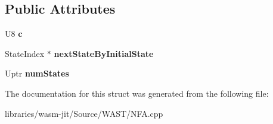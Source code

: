 \subsection*{Public Attributes}
\begin{DoxyCompactItemize}
\item 
\mbox{\label{struct_n_f_a_1_1_state_transitions_by_char_a6d6a713162e6bf59ac1b0cb22acb481a}} 
U8 {\bfseries c}
\item 
\mbox{\label{struct_n_f_a_1_1_state_transitions_by_char_a2ddc6fa25470d3c4f0c8d39a626cddec}} 
State\+Index $\ast$ {\bfseries next\+State\+By\+Initial\+State}
\item 
\mbox{\label{struct_n_f_a_1_1_state_transitions_by_char_ab5fce543678c9aa3396afcd56a5df096}} 
Uptr {\bfseries num\+States}
\end{DoxyCompactItemize}


The documentation for this struct was generated from the following file\+:\begin{DoxyCompactItemize}
\item 
libraries/wasm-\/jit/\+Source/\+W\+A\+S\+T/N\+F\+A.\+cpp\end{DoxyCompactItemize}
